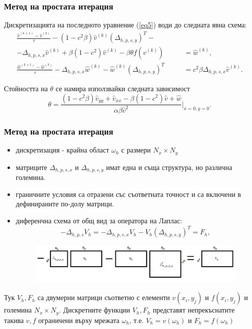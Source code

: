 \documentclass{beamer}
\newcommand{\rf}[1]{(\ref{#1})}
\begin{document}
\begin{frame}
\frametitle{Метод на простата итерация} 
Дискретизацията на последното уравнение \rf{eq5} води до следната явна схема:
\begin{equation}\label{eq555}
\begin{split}
\frac {\widehat{v}^{(k+1)}-\widehat{v}^{(k)}}{\tau}- (1-c^2 \beta) \widehat{v}^{(k)}  (\Delta_{h,p,s,y})^T - \quad\quad\quad\;&\\
-\Delta_{h,p,s,x}  \widehat{v}^{(k)}+ \beta (1-c^2 ) \widehat{v}^{(k)} - \beta \theta f(\widehat{v}^{(k)}) &= \widehat{w}^{(k)}, \\
\frac  {\widehat{w}^{(k+1)} -\widehat{w}^{(k)}} {\tau} - \Delta_{h,p,s,x}  \widehat{w}^{(k)} - \widehat{w}^{(k)}  (\Delta_{h,p,s,y})^T &=  c^2 \beta \Delta_{h,p,s,x}  \widehat{v}^{(k)}.
\end{split}
\end{equation}

Стойността на $\theta$ се намира използвайки следната зависимост
\begin{equation}\label{eqtheta}
\theta = \frac{ (1-c^2 \beta) \widehat{v}_{yy} + \widehat{v}_{xx} - \beta (1-c^2) \widehat{v} +\widehat{w}}{\alpha \beta \widehat{v}^2 } |_{x=0,y=0}.
\end{equation}
\end{frame}


\begin{frame}
\frametitle{Метод на простата итерация}

\begin{itemize}
  \item дискретизация - крайна област $\omega_h$ с размери $N_x \times N_y$
  \item матриците $\Delta_{h,p,s,x}$ и $\Delta_{h,p,s,y}$ имат една и съща структура, но различна големина.
  \item граничните условия са отразени със съответната точност и са включени в дефинираните по-долу матрици.
  \item диференчна схема от общ вид за оператора на Лаплас:
\begin{equation}\label{PsnDiscret}
-\Delta_{h,p,s}  V_h = -\Delta_{h,p,s,x}  V_h - V_h (\Delta_{h,p,s,y})^T = F_h,
\end{equation}
\begin{figure}
     \includegraphics[width=\linewidth]{FPSExplained.png}
	\label{fig:FPSexplained}
\end{figure}
\end{itemize}
Тук $V_h, F_h$ са двумерни матрици съответно с елементи  $v(x_i,y_j)$ и  $f(x_i,y_j)$ и големина $N_x\times N_y$. Дискретните функции $V_h, F_h$ представят непрекъснатите такива $v, f$ ограничени върху мрежата $\omega_h$, т.е. $V_h = v(\omega_h)$ и $F_h = f(\omega_h)$
\end{frame}
\end{document}
